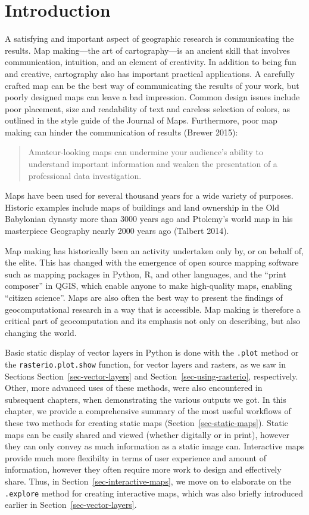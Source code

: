 \documentclass[
  letterpaper,
]{krantz}
\begin{document}
\section{Introduction}\label{introduction-7}

A satisfying and important aspect of geographic research is
communicating the results. Map making---the art of cartography---is an
ancient skill that involves communication, intuition, and an element of
creativity. In addition to being fun and creative, cartography also has
important practical applications. A carefully crafted map can be the
best way of communicating the results of your work, but poorly designed
maps can leave a bad impression. Common design issues include poor
placement, size and readability of text and careless selection of
colors, as outlined in the style guide of the Journal of Maps.
Furthermore, poor map making can hinder the communication of results
(Brewer 2015):

\begin{quote}
Amateur-looking maps can undermine your audience's ability to understand
important information and weaken the presentation of a professional data
investigation.
\end{quote}

Maps have been used for several thousand years for a wide variety of
purposes. Historic examples include maps of buildings and land ownership
in the Old Babylonian dynasty more than 3000 years ago and Ptolemy's
world map in his masterpiece Geography nearly 2000 years ago (Talbert
2014).

Map making has historically been an activity undertaken only by, or on
behalf of, the elite. This has changed with the emergence of open source
mapping software such as mapping packages in Python, R, and other
languages, and the ``print composer'' in QGIS, which enable anyone to
make high-quality maps, enabling ``citizen science''. Maps are also
often the best way to present the findings of geocomputational research
in a way that is accessible. Map making is therefore a critical part of
geocomputation and its emphasis not only on describing, but also
changing the world.

Basic static display of vector layers in Python is done with the
\texttt{.plot} method or the \texttt{rasterio.plot.show} function, for
vector layers and rasters, as we saw in Sections
Section~\ref{sec-vector-layers} and Section~\ref{sec-using-rasterio},
respectively. Other, more advanced uses of these methods, were also
encountered in subsequent chapters, when demonstrating the various
outputs we got. In this chapter, we provide a comprehensive summary of
the most useful workflows of these two methods for creating static maps
(Section~\ref{sec-static-maps}). Static maps can be easily shared and
viewed (whether digitally or in print), however they can only convey as
much information as a static image can. Interactive maps provide much
more flexibilty in terms of user experience and amount of information,
however they often require more work to design and effectively share.
Thus, in Section~\ref{sec-interactive-maps}, we move on to elaborate on
the \texttt{.explore} method for creating interactive maps, which was
also briefly introduced earlier in Section~\ref{sec-vector-layers}.
\end{document}
